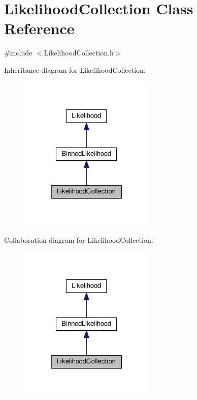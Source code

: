\hypertarget{classLikelihoodCollection}{\section{Likelihood\-Collection Class Reference}
\label{classLikelihoodCollection}
}


{\ttfamily \#include $<$Likelihood\-Collection.\-h$>$}



Inheritance diagram for Likelihood\-Collection\-:
\nopagebreak
\begin{figure}[H]
\begin{center}
\leavevmode
\includegraphics[width=184pt]{classLikelihoodCollection__inherit__graph}
\end{center}
\end{figure}


Collaboration diagram for Likelihood\-Collection\-:
\nopagebreak
\begin{figure}[H]
\begin{center}
\leavevmode
\includegraphics[width=184pt]{classLikelihoodCollection__coll__graph}
\end{center}
\end{figure}
